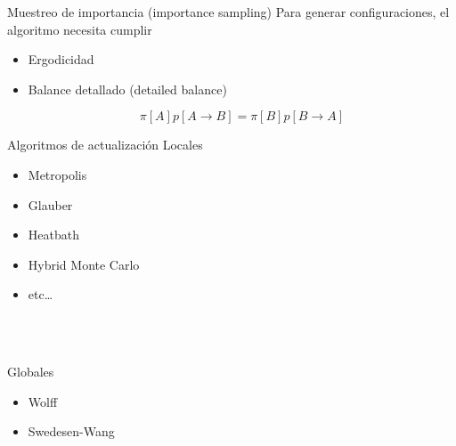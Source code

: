 \documentclass[11pt]{beamer}
\begin{document}
\begin{frame}{Muestreo de importancia (importance sampling)}
    Para generar configuraciones, el algoritmo necesita cumplir
    \begin{itemize}
        \item<1-> Ergodicidad
        \begin{center}
        \end{center}
        \item<2-> Balance detallado (detailed balance)
        \begin{center}
    \end{center}
    $$ \pi[A]p[A \to B] = \pi[B]p[B \to A]$$
    \end{itemize}
    
    
\end{frame}

\begin{frame}{Algoritmos de actualización}
    Locales
    \begin{itemize}
        \item Metropolis
        \item Glauber
        \item Heatbath
        \item Hybrid Monte Carlo
        \item etc\dots
    \end{itemize}
    
    \ \\~
    
    Globales
    \begin{itemize}
        \item Wolff
        \item Swedesen-Wang
    \end{itemize}
\end{frame}
\end{document}
